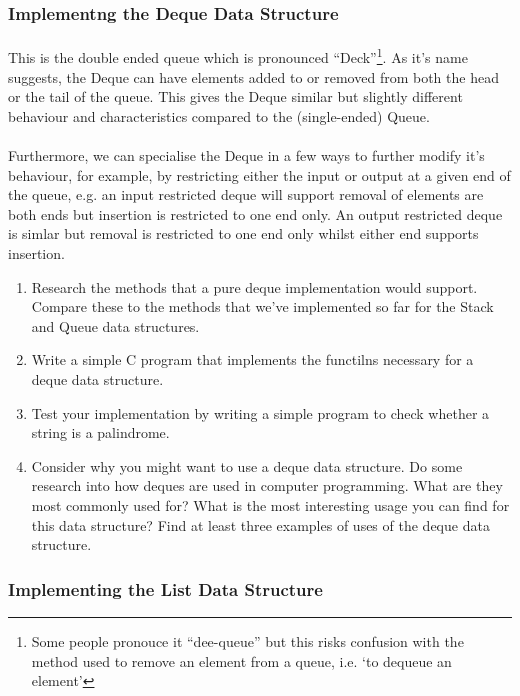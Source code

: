 \documentclass[10pt, a4paper, twosize]{article}
\begin{document}
\subsubsection{Implementng the Deque Data Structure}

\paragraph{} This is the double ended queue which is pronounced ``Deck''\footnote{Some people pronouce it ``dee-queue'' but this risks confusion with the method used to remove an element from a queue, i.e. `to dequeue an element'}. As it's name suggests, the Deque can have elements added to or removed from both the head or the tail of the queue. This gives the Deque similar but slightly different behaviour and characteristics compared to the (single-ended) Queue.

\paragraph{} Furthermore, we can specialise the Deque in a few ways to further modify it's behaviour, for example, by restricting either the input or output at a given end of the queue, e.g. an input restricted deque will support removal of elements are both ends but insertion is restricted to one end only. An output restricted deque is simlar but removal is restricted to one end only whilst either end supports insertion.

\begin{enumerate}
\item Research the methods that a pure deque implementation would support. Compare these to the methods that we've implemented so far for the Stack and Queue data structures.
\item Write a simple C program that implements the functilns necessary for a deque data structure.
\item Test your implementation by writing a simple program to check whether a string is a palindrome.
\item Consider why you might want to use a deque data structure. Do some research into how deques are used in computer programming. What are they most commonly used for? What is the most interesting usage you can find for this data structure? Find at least three examples of uses of the deque data structure.
\end{enumerate}


\subsubsection{Implementing the List Data Structure}
\end{document}
